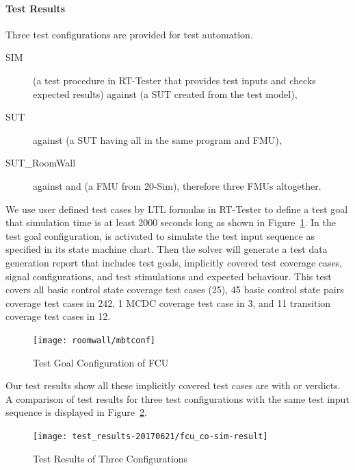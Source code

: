 \paragraph{Test Results}
Three test configurations are provided for test automation.
\begin{description}
    \item[SIM]  (a test procedure in RT-Tester that provides test inputs and checks expected results) against  (a SUT created from the test model), 
    \item[SUT]  against  (a SUT having all in the same program and FMU), 
    \item[SUT\_RoomWall]  against  and  (a FMU from 20-Sim), therefore three FMUs altogether.
\end{description}

We use user defined test cases by LTL formulas in RT-Tester to define a test goal that simulation time is at least 2000 seconds long as shown in Figure~\ref{fig:fcu_mbtconf}. In the test goal configuration,  is activated to simulate the test input sequence as specified in its state machine chart. Then the solver will generate a test data generation report that includes test goals, implicitly covered test coverage cases, signal configurations, and test stimulations and expected behaviour. This test covers all basic control state coverage test cases (25), 45 basic control state pairs coverage test cases in 242, 1 MCDC coverage test case in 3, and 11 transition coverage test cases in 12. 
\begin{figure}[htb!]
    \centering
	\texttt{[image: roomwall/mbtconf]}
    \caption{Test Goal Configuration of FCU}
    \label{fig:fcu_mbtconf}
\end{figure}

Our test results show all these implicitly covered test cases are with  or  verdicts. A comparison of test results for three test configurations with the same test input sequence is displayed in Figure~\ref{fig:fcu_co-sim-result}.
\begin{figure}[htb!]
    \centering
	\texttt{[image: test\_results-20170621/fcu\_co-sim-result]}
    \caption{Test Results of Three Configurations}
    \label{fig:fcu_co-sim-result}
\end{figure}

